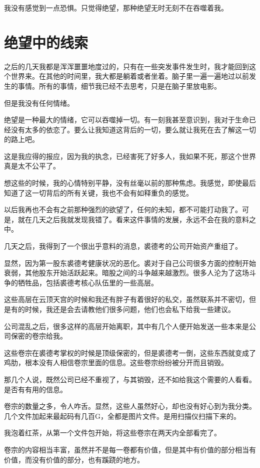 我没有感觉到一点恐惧。只觉得绝望，那种绝望无时无刻不在吞噬着我。

\chapter{绝望中的线索}

之后的几天我都是浑浑噩噩地度过的，只有在一些突发事件发生时，我才能回到这个世界来。在其他的时间里，我大都是躺着或者坐着。脑子里一遍一遍地过以前发生的事情。所有的事情，细节我已经不去思考，只是在脑子里放电影。

但是我没有任何情绪。

绝望是一种最大的情绪，它可以吞噬掉一切。有一刻我甚至意识到，我对于生命已经没有太多的依恋了。要么让我知道这背后的一切，要么就让我死在去了解这一切的路上吧。

这是我应得的报应，因为我的执念，已经害死了好多人，我如果不死，那这个世界真是太不公平了。

想这些的时候，我的心情特别平静，没有丝毫以前的那种焦虑。我感觉，即使最后知道了这一切背后的所有关键，我也不会有如释重负的感觉。

以后我再也不会有之前那种强烈的欲望了，任何的未知，都不可能打动我了。可是，就在几天之后我就发现我错了。看来这件事情的发展，永远不会在我的意料之中。

几天之后，我得到了一个很出乎意料的消息，裘德考的公司开始资产重组了。

显然，因为第一股东裘德考健康状况的恶化。裘对于自己公司很多方面的控制开始衰弱，其他股东开始活跃起来。暗股之间的斗争越来越激烈。很多人沦为了这场斗争的牺牲品，包括裘德考核心队伍里的一些高层。

这些高层在云顶天宫的时候和我还有胖子有着很好的私交，虽然联系并不密切，但是有的时候，我还是会去请教他们很多问题，他们也会私下给我一些建议。

公司混乱之后，很多这样的高层开始离职，其中有几个人便开始发送一些本来是公司保密的卷宗给我。

这些卷宗在裘德考掌权的时候是顶级保密的，但是裘德考一倒，这些东西就变成了鸡肋，根本没有人相信卷宗里面的信息。这些卷宗纷纷被分开而且销毁。

那几个人说，既然公司已经不重视了，与其销毁，还不如给我这个需要的人看看。是否有有用的信息。

卷宗的数量之多，令人咋舌。显然，这些人虽然好心，却也没有好心到为我分类。几个文件加起来最起码有几百G，全都是图片文件。是用扫描仪扫描下来的。

我泡着红茶，从第一个文件包开始，将这些卷宗在两天内全部看完了。

卷宗的内容相当丰富，虽然并不是每一卷都有价值，但是其中有价值的部分相当有价值，而没有价值的部分，也有蹊跷的地方。

